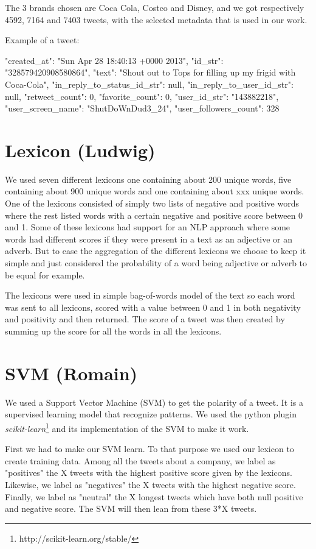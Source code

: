 \documentclass[a4paper,11pt]{report}
\begin{document}
The 3 brands chosen are Coca Cola, Costco and Disney, and we got respectively 4592, 7164 and 7403 tweets, with the selected metadata that is used in our work.

Example of a tweet:

{
	"created_at": "Sun Apr 28 18:40:13 +0000 2013",
	"id_str": "328579420908580864",
	"text": "Shout out to Tops for filling up my frigid with Coca-Cola",
	"in_reply_to_status_id_str": null,
	"in_reply_to_user_id_str": null,
	"retweet_count": 0,
	"favorite_count": 0,
	"user_id_str": "143882218",
	"user_screen_name": "ShutDoWnDud3_24",
	"user_followers_count": 328
}

\section{Lexicon (Ludwig)}
We used seven different lexicons one containing about 200 unique words, five containing about 900 unique words and one containing about xxx unique words.
One of the lexicons consisted of simply two lists of negative and positive words where the rest listed words with a certain negative and positive score between 0 and 1. 
Some of these lexicons had support for an NLP approach where some words had different scores if they were present in a text as an adjective or an adverb.  
But to ease the aggregation of the different lexicons we choose to keep it simple and just considered the probability of a word being adjective or adverb to be equal for example.

The lexicons were used in simple bag-of-words model of the text so each word was sent to all lexicons, scored with a value between 0 and 1 in both negativity and positivity and then returned. 
The score of a tweet was then created by summing up the score for all the words in all the lexicons. 

\section{SVM (Romain)}
We used a Support Vector Machine (SVM) to get the polarity of a tweet. It is a supervised learning model that recognize patterns. We used the python plugin \textit{scikit-learn}\footnote{http://scikit-learn.org/stable/} and its implementation of the SVM to make it work.

First we had to make our SVM learn. To that purpose we used our lexicon to create training data. Among all the tweets about a company, we label as "positives" the X tweets with the highest positive score given by the lexicons. Likewise, we label as "negatives" the X tweets with the highest negative score. Finally, we label as "neutral" the X longest tweets which have both null positive and negative score. The SVM will then lean from these 3*X tweets.
\end{document}
